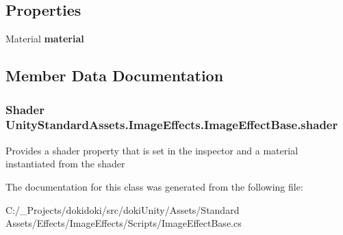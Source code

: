 \subsection*{Properties}
\begin{DoxyCompactItemize}
\item 
Material {\bfseries material}\hypertarget{class_unity_standard_assets_1_1_image_effects_1_1_image_effect_base_a01be32995d707d066c79abd94e5089c2}{}\label{class_unity_standard_assets_1_1_image_effects_1_1_image_effect_base_a01be32995d707d066c79abd94e5089c2}

\end{DoxyCompactItemize}


\subsection{Member Data Documentation}
\subsubsection[{\texorpdfstring{shader}{shader}}]{\setlength{\rightskip}{0pt plus 5cm}Shader Unity\+Standard\+Assets.\+Image\+Effects.\+Image\+Effect\+Base.\+shader}\hypertarget{class_unity_standard_assets_1_1_image_effects_1_1_image_effect_base_a8e9767f9fb7f9d66c187173cedfb5ccf}{}\label{class_unity_standard_assets_1_1_image_effects_1_1_image_effect_base_a8e9767f9fb7f9d66c187173cedfb5ccf}
Provides a shader property that is set in the inspector and a material instantiated from the shader 

The documentation for this class was generated from the following file\+:\begin{DoxyCompactItemize}
\item 
C\+:/\+\_\+\+Projects/dokidoki/src/doki\+Unity/\+Assets/\+Standard Assets/\+Effects/\+Image\+Effects/\+Scripts/Image\+Effect\+Base.\+cs\end{DoxyCompactItemize}
